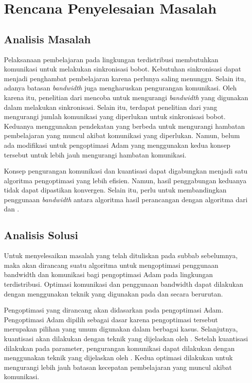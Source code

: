\chapter{Rencana Penyelesaian Masalah}

\section{Analisis Masalah}

Pelaksanaan pembelajaran pada lingkungan terdistribusi membutuhkan komunikasi untuk melakukan sinkronisasi bobot. Kebutuhan sinkronisasi dapat menjadi penghambat pembelajaran karena perlunya saling menunggu. Selain itu, adanya batasan \emph{bandwidth} juga mengharuskan pengurangan komunikasi. Oleh karena itu, penelitian dari \textcite{Chen2021CADA} mencoba untuk mengurangi \emph{bandwidth} yang digunakan dalam melakukan sinkronisasi. Selain itu, terdapat penelitian dari \textcite{Chen2022Efficient} yang mengurangi jumlah komunikasi yang diperlukan untuk sinkronisasi bobot. Keduanya menggunakan pendekatan yang berbeda untuk mengurangi hambatan pembelajaran yang muncul akibat komunikasi yang diperlukan. Namun, belum ada modifikasi untuk pengoptimasi Adam yang menggunakan kedua konsep tersebut untuk lebih jauh mengurangi hambatan komunikasi.

Konsep pengurangan komunikasi dan kuantisasi dapat digabungkan menjadi satu algoritma pengoptimasi yang lebih efisien. Namun, hasil penggabungan keduanya tidak dapat dipastikan konvergen. Selain itu, perlu untuk membandingkan penggunaan \emph{bandwidth} antara algoritma hasil perancangan dengan algoritma dari \textcite{Chen2021CADA} dan \textcite{Chen2022Efficient}.

\section{Analisis Solusi}
Untuk menyelesaikan masalah yang telah dituliskan pada subbab sebelumnya, maka akan dirancang suatu algoritma untuk mengoptimasi penggunaan bandwidth dan komunikasi bagi pengoptimasi Adam pada lingkungan terdistribusi. Optimasi komunikasi dan penggunaan bandwidth dapat dilakukan dengan menggunakan teknik yang digunakan pada \textcite{Chen2021CADA} dan \textcite{Chen2022Efficient} secara berurutan.

Pengoptimasi yang dirancang akan didasarkan pada pengoptimasi Adam. Pengoptimasi Adam dipilih sebagai dasar karena pengoptimasi tersebut merupakan pilihan yang umum digunakan dalam berbagai kasus. Selanjutnya, kuantisasi akan dilakukan dengan teknik yang dijelaskan oleh \textcite{Chen2021CADA}. Setelah kuantisasi dilakukan pada parameter, pengurangan komunikasi dapat dilakukan dengan menggunakan teknik yang dijelaskan oleh \textcite{Chen2022Efficient}. Kedua optimasi dilakukan untuk mengurangi lebih jauh batasan kecepatan pembelajaran yang muncul akibat komunikasi.

